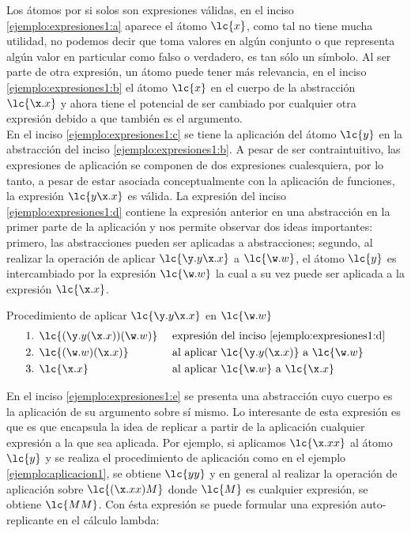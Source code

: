 Los átomos por si solos son expresiones válidas, en el inciso
\ref{ejemplo:expresiones1:a} aparece el átomo \(\lc{x}\), como tal no tiene
mucha utilidad, no podemos decir que toma valores en algún conjunto o que
representa algún valor en particular como falso o verdadero, es tan sólo un
símbolo. Al ser parte de otra expresión, un átomo puede tener más relevancia, en
el inciso \ref{ejemplo:expresiones1:b} el átomo \(\lc{x}\) en el cuerpo de la
abstracción \(\lc{\x.x}\) y ahora tiene el potencial de ser cambiado por
cualquier otra expresión debido a que también es el argumento. \\

En el inciso \ref{ejemplo:expresiones1:c} se tiene la aplicación del átomo
\(\lc{y}\) en la abstracción del inciso \ref{ejemplo:expresiones1:b}. A pesar de
ser contraintuitivo, las expresiones de aplicación se componen de dos
expresiones cualesquiera, por lo tanto, a pesar de estar asociada
conceptualmente con la aplicación de funciones, la expresión \(\lc{y\x.x}\) es
válida. La expresión del inciso \ref{ejemplo:expresiones1:d} contiene la
expresión anterior en una abstracción en la primer parte de la aplicación y nos
permite observar dos ideas importantes: primero, las abstracciones pueden ser
aplicadas a abstracciones; segundo, al realizar la operación de aplicar
\(\lc{\y.y\x.x}\) a \(\lc{\w.w}\), el átomo \(\lc{y}\) es intercambiado por la
expresión \(\lc{\w.w}\) la cual a su vez puede ser aplicada a la expresión
\(\lc{\x.x}\). \\

\begin{ejemplo} Procedimiento de aplicar \(\lc{\y.y\x.x}\) en \(\lc{\w.w}\) \label{ejemplo:aplicacion1}
  \begin{align*}
    \text{1. } &\lc{(\y.y(\x.x))(\w.w)} & &\text{ expresión del inciso \ref{ejemplo:expresiones1:d}}\\ 
    \text{2. } &\lc{(\w.w)(\x.x)} & &\text{ al aplicar } \lc{\y.y(\x.x)} \text{ a } \lc{\w.w}\\ 
    \text{3. } &\lc{\x.x} & &\text{ al aplicar } \lc{\w.w} \text{ a } \lc{\x.x}
  \end{align*}
\end{ejemplo}

En el inciso \ref{ejemplo:expresiones1:e} se presenta una abstracción cuyo
cuerpo es la aplicación de su argumento sobre sí mismo. Lo interesante de esta
expresión es que es que encapsula la idea de replicar a partir de la aplicación
cualquier expresión a la que sea aplicada. Por ejemplo, si aplicamos \(\lc{\x.x
  x}\) al átomo \(\lc{y}\) y se realiza el procedimiento de aplicación como en
el ejemplo \ref{ejemplo:aplicacion1}, se obtiene \(\lc{y y}\) y en general al
realizar la operación de aplicación sobre \(\lc{(\x.x x)M}\) donde \(\lc{M}\) es
cualquier expresión, se obtiene \(\lc{M M}\). Con ésta expresión se puede
formular una expresión auto-replicante en el cálculo lambda: \\

